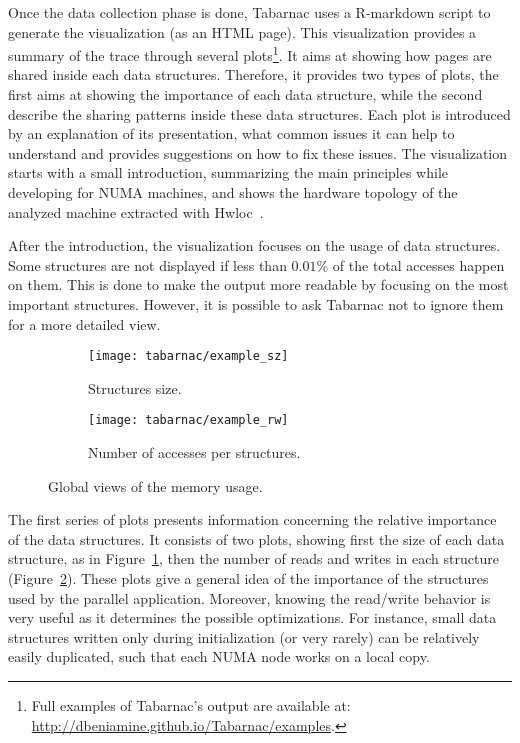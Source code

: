 Once the data collection phase is done, \gls{Tabarnac} uses a \gls{R-markdown} script to generate the visualization (as an HTML page).
This visualization provides a summary of the trace through several plots\footnote{
    Full examples of \gls{Tabarnac}'s output are available at:\\ \url{http://dbeniamine.github.io/Tabarnac/examples}.}.
It aims at showing how pages are shared inside each data structures.
Therefore, it provides two types of plots, the first aims at showing the importance of each data structure, while the second describe the sharing patterns inside these data structures.
Each plot is introduced by an explanation of its presentation, what common issues it can help to understand and provides suggestions on how to fix these issues.
The visualization starts with a small introduction, summarizing the main principles while developing for \gls{NUMA} machines, and shows the hardware topology of the analyzed machine extracted
with Hwloc~\cite{Broquedis10hwloc}.

After the introduction, the visualization focuses on the usage of data structures.
Some structures are not displayed if less than $0.01\%$ of the total accesses happen on them.
This is done to make the output more readable by focusing on the most important structures.
However, it is possible to ask \gls{Tabarnac} not to ignore them for a more detailed view.

\begin{figure}[htb]
    \centering
    \begin{subfigure}{.49\linewidth}
        \texttt{[image: tabarnac/example\_sz]}
        \caption{Structures size.}
        \label{fig:example_sz}
    \end{subfigure}
    \begin{subfigure}{.49\linewidth}
        \texttt{[image: tabarnac/example\_rw]}
        \caption{Number of accesses per structures.}
        \label{fig:example_rw}
    \end{subfigure}
    \caption{Global views of the memory usage.}
    \label{fig:example_plot1}
\end{figure}

The first series of plots presents information concerning the relative importance of the data structures.
It consists of two plots, showing first the size of each data structure, as in Figure~\ref{fig:example_sz}, then the number of reads and writes in each structure (Figure~\ref{fig:example_rw}).
These plots give a general idea of the importance of the structures used by the parallel application.
Moreover, knowing the read/write behavior is very useful as it determines the possible optimizations.
For instance, small data structures written only during initialization (or very rarely) can be relatively easily
duplicated, such that each \gls{NUMA} node works on a local copy.

